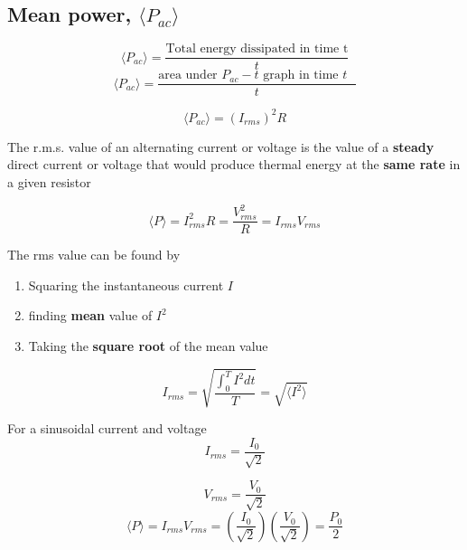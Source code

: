 \documentclass[a4paper, 10pt]{article}
\begin{document}
\subsection{Mean power, $\langle P_{ac} \rangle$}
\[
   \langle P_{ac} \rangle= \frac{\text{Total energy dissipated in time t}}{t}
\]
\[
   \langle P_{ac} \rangle= \frac{\text{area under $P_{ac} - t$ graph in time $t$ }}{t}
\]

\[
   \langle P_{ac} \rangle = \left( I_{rms} \right)^2 R
\]

\begin{framed}
   The r.m.s. value of an alternating current or voltage is the value of a \textbf{steady} direct current or voltage that would produce thermal energy at the \textbf{same rate} in a given resistor

   \[
      \langle P \rangle = I_{rms}^2 R = \frac{V_{rms}^2}{R} = I_{rms} V_{rms}
   \]
   
\end{framed}	
The rms value can be found by
\begin{enumerate}
   \item Squaring the instantaneous current $I$ 
   \item finding \textbf{mean} value of $I^2$ 
   \item Taking the \textbf{square root} of the mean value
\end{enumerate}	
\[
   I_{rms} = \sqrt{\frac{\int_0^T I^2 dt}{T}} = \sqrt{\langle I^2 \rangle}
\]

\begin{framed}
For a sinusoidal current and voltage 
\[
   I_{rms} = \frac{I_0}{\sqrt{2}}
\]

\[
   V_{rms} = \frac{V_0}{\sqrt{2}}
\]
\[
   \langle P \rangle = I_{rms} V_{rms} = \left( \frac{I_0}{\sqrt{2}} \right) \left( \frac{V_0}{\sqrt{2}} \right)  = \frac{P_0}{2}
\]
\end{framed}	
\end{document}
